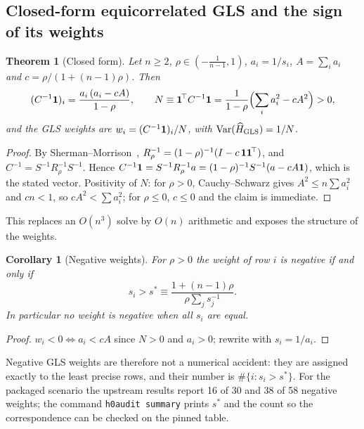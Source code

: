 \documentclass[11pt,a4paper]{article}
\newtheorem{theorem}{Theorem}
\newtheorem{corollary}{Corollary}
\theoremstyle{remark}\newtheorem{remark}{Remark}
\DeclareMathOperator{\Var}{Var}\DeclareMathOperator{\Cov}{Cov}\DeclareMathOperator{\Corr}{Corr}
\begin{document}
\subsection{Closed-form equicorrelated GLS and the sign of its weights}
\begin{theorem}[Closed form]\label{thm:closed}
Let $n\ge2$, $\rho\in(-\tfrac1{n-1},1)$, $a_i=1/s_i$, $A=\sum_ia_i$ and $c=\rho/(1+(n-1)\rho)$. Then
\begin{equation}
(C^{-1}\bm{1})_i=\frac{a_i\,(a_i-cA)}{1-\rho},\qquad N\equiv\bm{1}^{\!\top}C^{-1}\bm{1}=\frac{1}{1-\rho}\Bigl(\sum_ia_i^2-cA^2\Bigr)>0,
\end{equation}
and the GLS weights are $w_i=(C^{-1}\bm{1})_i/N$, with $\Var(\widehat H_{\rm GLS})=1/N$.
\end{theorem}
\begin{proof}
By Sherman--Morrison~\cite{ShermanMorrison1950}, $R_\rho^{-1}=(1-\rho)^{-1}(I-c\,\bm{1}\bm{1}^{\!\top})$, and $C^{-1}=S^{-1}R_\rho^{-1}S^{-1}$. Hence $C^{-1}\bm{1}=S^{-1}R_\rho^{-1}a=(1-\rho)^{-1}S^{-1}(a-cA\bm{1})$, which is the stated vector. Positivity of $N$: for $\rho>0$, Cauchy--Schwarz gives $A^2\le n\sum a_i^2$ and $cn<1$, so $cA^2<\sum a_i^2$; for $\rho\le0$, $c\le0$ and the claim is immediate.
\end{proof}
This replaces an $O(n^3)$ solve by $O(n)$ arithmetic and exposes the structure of the weights.
\begin{corollary}[Negative weights]\label{cor:neg}
For $\rho>0$ the weight of row $i$ is negative if and only if
\begin{equation}
s_i>s^\ast\equiv\frac{1+(n-1)\rho}{\rho\sum_j s_j^{-1}}.
\end{equation}
In particular no weight is negative when all $s_i$ are equal.
\end{corollary}
\begin{proof}
$w_i<0\iff a_i<cA$ since $N>0$ and $a_i>0$; rewrite with $s_i=1/a_i$.
\end{proof}
\noindent Negative GLS weights are therefore not a numerical accident: they are assigned exactly to the least precise rows, and their number is $\#\{i:s_i>s^\ast\}$. For the packaged scenario the upstream results report 16 of 30 and 38 of 58 negative weights; the command \texttt{h0audit summary} prints $s^\ast$ and the count so the correspondence can be checked on the pinned table.
\end{document}
